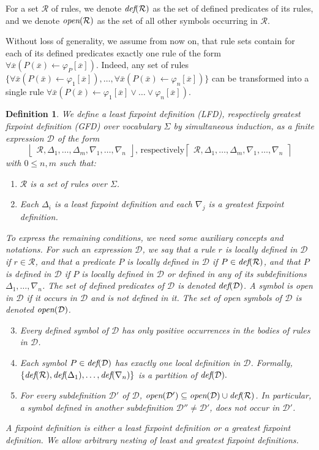 \documentclass{tlp}
\newcommand{\rul}{\leftarrow}
\newcommand{\xxx}{\overline{x}}
\newcommand{\lfd}[1]{\ensuremath{\left \lfloor \begin{array}{l}#1\end{array} \right \rfloor }}
\newcommand{\gfd}[1]{\ensuremath{\left \lceil \begin{array}{l}#1\end{array} \right \rceil}}
\newcommand{\FD}{\ensuremath{\mathcal{D}}\xspace}
\newcommand{\LFD}{\ensuremath{\Delta}\xspace}
\newcommand{\GFD}{\ensuremath{\nabla}\xspace}
\newcommand{\defp}[1]{\ensuremath{\mbox{\it def}(#1)}\xspace}
\newcommand{\openp}[1]{\ensuremath{\mbox{\it open}(#1)}\xspace}
\newcommand{\Voc}{\ensuremath{\Sigma}\xspace}
\newcommand{\Rules}{\ensuremath{\mathcal{R}}\xspace}
\newtheorem{definition}[lemma]{Definition}
\begin{document}
For a set $\Rules$ of rules, we denote $\defp{\Rules}$ as the set of defined predicates of its rules, and we denote $\openp{\Rules}$ as the set of all other symbols occurring in $\Rules$.

Without loss of generality, we assume from now on, that rule sets contain for each of its defined predicates exactly one rule of the form $\forall \xxx (P(\xxx) \rul \varphi_P[\xxx])$. Indeed, any set of rules $\{ \forall \bar{x}(P(\bar x) \rul \varphi_1[\xxx]), \ldots, \forall \bar{x}(P(\bar x) \rul \varphi_n[\xxx]) \}$ can be transformed into a single rule $\forall \bar{x}(P(\bar x) \rul \varphi_1[\xxx] \lor \ldots \lor \varphi_n[\xxx])$.

\begin{definition} \label{def:fixpointdefinition}
We define a {\em least fixpoint definition} (LFD), respectively {\em greatest fixpoint definition} (GFD) over vocabulary $\Voc$ by simultaneous induction, as a finite expression $\FD$ of the form $$\lfd{ \Rules, \LFD_1,\dots,\LFD_m, \GFD_1,\dots,\GFD_n} \mbox{, respectively} \gfd{ \Rules, \LFD_1,\dots,\LFD_m, \GFD_1,\dots,\GFD_n}$$ with $0\leq n, m$ such that:
\begin{enumerate}
\item \Rules is a set of rules over \Voc.
\item Each $\LFD_i$ is a least fixpoint definition and each $\GFD_j$ is a greatest fixpoint definition.
\end{enumerate}
To express the remaining conditions, we need some auxiliary concepts and notations. For such an expression $\FD$, we say that a rule $r$ is {\em locally defined} in $\FD$ if $r \in \Rules$, and that a predicate $P$ is {\em locally defined} in $\FD$ if $P\in\defp{\Rules}$, and that $P$ is {\em defined} in $\FD$ if $P$ is locally defined in $\FD$ or defined in any of its subdefinitions $\LFD_1,\dots,\GFD_n$. The set of defined predicates of $\FD$ is denoted $\defp{\FD}$. A symbol is {\em open} in $\FD$ if it occurs in $\FD$ and is not defined in it. The set of open symbols of $\FD$ is denoted $\openp{\FD}$.
\begin{enumerate}
\setcounter{enumi}{2}
\item Every defined symbol of $\FD$ has only positive occurrences in the bodies of rules in $\FD$.
\item Each symbol $P\in\defp{\FD}$ has exactly one local definition in $\FD$. Formally, $\{ \defp{\Rules}, \defp{\LFD_1},\dots,\defp{\GFD_n}\}$ is a partition of $\defp{\FD}.$
\item For every subdefinition $\FD'$ of $\FD$, $\openp{\FD'}\subseteq\openp{\FD}\cup\defp{\Rules}$. In  particular, a symbol defined in another subdefinition $\FD''\neq \FD'$, does not occur in $\FD'$.
\end{enumerate}
A {\em fixpoint definition} is either a least fixpoint definition or a greatest fixpoint definition. We allow arbitrary nesting of least and greatest fixpoint definitions.
\end{definition}
\end{document}
